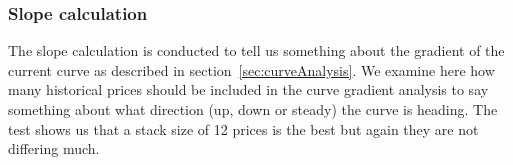 \begin{table}[H]
\centering  %
\caption{Number of historical prices to include in the skewness calculation} %
\label{table:SkewnessTest} %
\end{table}

\subsubsection{Slope calculation}
The slope calculation is conducted to tell us something about the gradient of the current curve as described in section~\ref{sec:curveAnalysis}. We examine here how many historical prices should be included in the curve gradient analysis to say something about what direction (up, down or steady) the curve is heading. The test shows us that a stack size of 12 prices is the best but again they are not differing much.

